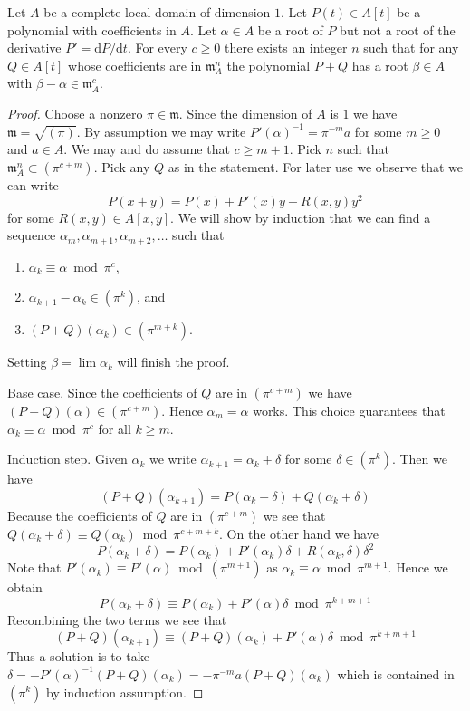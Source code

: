 \begin{lemma}
\label{lemma-krasner}
Let $A$ be a complete local domain of dimension $1$. Let $P(t) \in A[t]$
be a polynomial with coefficients in $A$. Let $\alpha \in A$ be a root
of $P$ but not a root of the derivative $P' = \text{d}P/\text{d}t$.
For every $c \geq 0$ there exists an integer $n$ such that for any
$Q \in A[t]$ whose coefficients are in $\mathfrak m_A^n$ the polynomial
$P + Q$ has a root $\beta \in A$ with $\beta - \alpha \in \mathfrak m_A^c$.
\end{lemma}

\begin{proof}
Choose a nonzero $\pi \in \mathfrak m$. Since the dimension of $A$ is $1$
we have $\mathfrak m = \sqrt{(\pi)}$. By assumption we may write
$P'(\alpha)^{-1} = \pi^{-m} a$ for some $m \geq 0$ and $a \in A$.
We may and do assume that $c \geq m + 1$.
Pick $n$ such that $\mathfrak m_A^n \subset (\pi^{c + m})$.
Pick any $Q$ as in the statement. For later use we observe that we can write
$$
P(x + y) = P(x) + P'(x)y + R(x, y)y^2
$$
for some $R(x, y) \in A[x, y]$. We will show by induction that we can find a
sequence $\alpha_m, \alpha_{m + 1}, \alpha_{m + 2}, \ldots$ such that
\begin{enumerate}
\item $\alpha_k \equiv \alpha \bmod \pi^c$,
\item $\alpha_{k + 1} - \alpha_k \in (\pi^k)$, and
\item $(P + Q)(\alpha_k) \in (\pi^{m + k})$.
\end{enumerate}
Setting $\beta = \lim \alpha_k$ will finish the proof.

\medskip\noindent
Base case. Since the coefficients of $Q$ are in $(\pi^{c + m})$ we have
$(P + Q)(\alpha) \in (\pi^{c + m})$. Hence $\alpha_m = \alpha$ works.
This choice guarantees that $\alpha_k \equiv \alpha \bmod \pi^c$
for all $k \geq m$.

\medskip\noindent
Induction step. Given $\alpha_k$ we write
$\alpha_{k + 1} = \alpha_k + \delta$ for some $\delta \in (\pi^k)$.
Then we have
$$
(P + Q)(\alpha_{k + 1}) =
P(\alpha_k + \delta) + Q(\alpha_k + \delta)
$$
Because the coefficients of $Q$ are in $(\pi^{c + m})$ we see that
$Q(\alpha_k + \delta) \equiv Q(\alpha_k) \bmod \pi^{c + m + k}$.
On the other hand we have
$$
P(\alpha_k + \delta) =
P(\alpha_k) + P'(\alpha_k)\delta + R(\alpha_k, \delta)\delta^2
$$
Note that $P'(\alpha_k) \equiv P'(\alpha) \bmod (\pi^{m + 1})$
as $\alpha_k \equiv \alpha \bmod \pi^{m + 1}$. Hence we obtain
$$
P(\alpha_k + \delta) \equiv P(\alpha_k) + P'(\alpha) \delta
\bmod \pi^{k + m + 1}
$$
Recombining the two terms we see that
$$
(P + Q)(\alpha_{k + 1}) \equiv (P + Q)(\alpha_k) + P'(\alpha) \delta
\bmod \pi^{k + m + 1}
$$
Thus a solution is to take
$\delta = -P'(\alpha)^{-1} (P + Q)(\alpha_k) =  - \pi^{-m} a (P + Q)(\alpha_k)$
which is contained in $(\pi^k)$ by induction assumption.
\end{proof}

